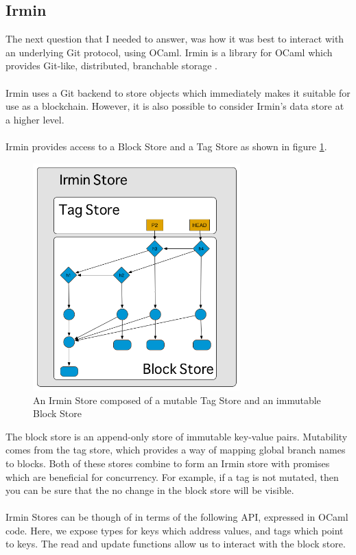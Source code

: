 \documentclass[12pt,a4paper,twoside,openright]{report}
\begin{document}
	\subsection{Irmin}
		The next question that I needed to answer, was how it was best to interact with an underlying Git protocol, using OCaml. Irmin is a library for OCaml which provides Git-like, distributed, branchable storage \cite{Irmin}.\\
		\\
		Irmin uses a Git backend to store objects which immediately makes it suitable for use as a blockchain. However, it is also possible to consider Irmin's data store at a higher level. \\
		\\
		Irmin provides access to a Block Store and a Tag Store as shown in figure \ref{fig:IrminBlockStore}.
		\begin{figure}
			\begin{center}
			\includegraphics[width=8cm]{figs/irmin-stores.png}
			\caption{An Irmin Store composed of a mutable Tag Store and an immutable Block Store}
			\label{fig:IrminBlockStore}
			\end{center}
		\end{figure}
		The block store is an append-only store of immutable key-value pairs. Mutability comes from the tag store, which provides a way of mapping global branch names to blocks. Both of these stores combine to form an Irmin store with  promises which are beneficial for concurrency. For example, if a tag is not mutated, then you can be sure that the no change in the block store will be visible.\\
		\\
		Irmin Stores can be though of in terms of the following API, expressed in OCaml code. Here, we expose types for keys which address values, and tags which point to keys. The read and update functions allow us to interact with the block store. \\
\end{document}
